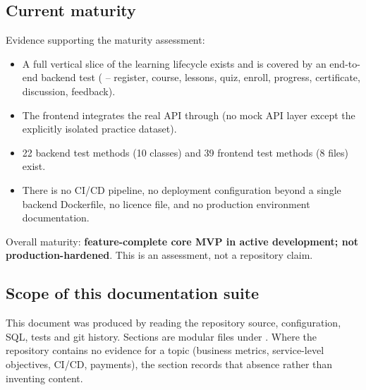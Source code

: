 \subsection{Current maturity}

Evidence supporting the maturity assessment:

\begin{itemize}
    \item A full vertical slice of the learning lifecycle exists and is covered by an end-to-end backend test ( -- register, course, lessons, quiz, enroll, progress, certificate, discussion, feedback).
    \item The frontend integrates the real API through  (no mock API layer except the explicitly isolated practice dataset).
    \item 22 backend test methods (10 classes) and 39 frontend test methods (8 files) exist.
    \item There is no CI/CD pipeline, no deployment configuration beyond a single backend Dockerfile, no licence file, and no production environment documentation.
\end{itemize}

\noindent Overall maturity: \textbf{feature-complete core MVP in active development; not production-hardened}. This is an assessment, not a repository claim.

\subsection{Scope of this documentation suite}

This document was produced by reading the repository source, configuration, SQL, tests and git history. Sections are modular files under . Where the repository contains no evidence for a topic (business metrics, service-level objectives, CI/CD, payments), the section records that absence rather than inventing content.
